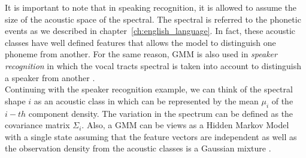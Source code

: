 \noindent It is important to note that in speaking recognition, it is allowed to assume the size of the acoustic space of the spectral. The spectral is referred to the phonetic events as we described in chapter~\ref{ch:english_language}. In fact, these acoustic classes have well defined features that allows the model to distinguish one phoneme from another. For the same reason, GMM is also used in \textit{speaker recognition} in which the vocal tracts spectral is taken into account to distinguish a speaker from another \cite{reynolds1992gaussian}. \\

\noindent Continuing with the speaker recognition example, we can think of the spectral shape $i$ as an acoustic class in which can be represented by the mean $\mu_{i}$ of the $i-th$ component density. The variation in the spectrum can be defined as the covariance matrix $\Sigma_{i}$. Also, a GMM can be views as a Hidden Markov Model with a single state assuming that the feature vectors are independent as well as the observation density from the acoustic classes is a Gaussian mixture \cite{reynolds2000speaker} \cite{reynolds1995robust}.
